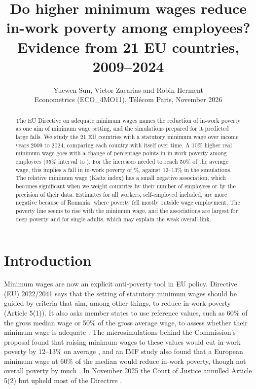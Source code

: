 \documentclass[10pt,a4paper]{article}
\title{\vspace{-1.6cm}\Large\textbf{Do higher minimum wages reduce in-work poverty among employees?\\Evidence from 21 EU countries, 2009--2024}}
\author{Yuewen Sun, Victor Zacarias and Robin Herment\\[1pt]
\small Econometrics (ECO\_4MO11), T\'el\'ecom Paris, November 2026}
\date{\vspace{-0.9cm}}
\begin{document}
\maketitle

\begin{abstract}
\noindent The EU Directive on adequate minimum wages names the reduction of in-work poverty as one aim of minimum wage setting, and the simulations prepared for it predicted large falls. We study the 21 EU countries with a statutory minimum wage over income years 2009 to 2024, comparing each country with itself over time. A 10\% higher real minimum wage goes with a change of \MainTen{} percentage points in in-work poverty among employees (95\% interval \MainTenLo{} to \MainTenHi). For the increases needed to reach 50\% of the average wage, this implies a fall in in-work poverty of \SimMw\%, against 12--13\% in the simulations. The relative minimum wage (Kaitz index) has a small negative association, which becomes significant when we weight countries by their number of employees or by the precision of their data. Estimates for all workers, self-employed included, are more negative because of Romania, where poverty fell mostly outside wage employment. The poverty line seems to rise with the minimum wage, and the associations are largest for deep poverty and for single adults, which may explain the weak overall link.
\end{abstract}

\section{Introduction}

Minimum wages are now an explicit anti-poverty tool in EU policy. Directive (EU) 2022/2041 says that the setting of statutory minimum wages should be guided by criteria that aim, among other things, to reduce in-work poverty (Article 5(1)). It also asks member states to use reference values, such as 60\% of the gross median wage or 50\% of the gross average wage, to assess whether their minimum wage is adequate \citep{directive2022}. The microsimulations behind the Commission's proposal found that raising minimum wages to these values would cut in-work poverty by 12--13\% on average \citep{grunberger2021}, and an IMF study also found that a European minimum wage at 60\% of the median would reduce in-work poverty, though not overall poverty by much \citep{detragiache2020}. In November 2025 the Court of Justice annulled Article 5(2) but upheld most of the Directive \citep{cjeu2025}.
\end{document}

